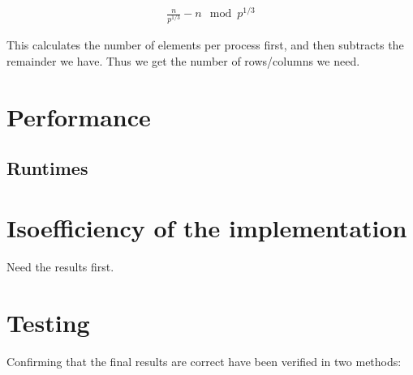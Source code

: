 \documentclass[a4paper,11pt,oneside]{book}
\begin{document}
\begin{align*}
    \frac{n}{p^{1/3}} - n \mod p^{1/3}
\end{align*}

This calculates the number of elements per process first, and then subtracts the remainder we have. Thus we get the number of rows/columns we need.

\chapter{Performance}
\section{Runtimes}




\chapter{Isoefficiency of the implementation}
Need the results first.

\chapter{Testing}
Confirming that the final results are correct have been verified in two methods:
\end{document}
